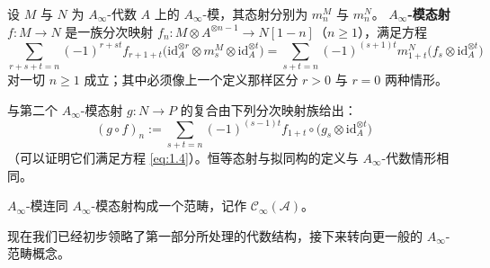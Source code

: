\begin{Def}\label{def:1.9}
设 $M$ 与 $N$ 为 $A_\infty$-代数 $A$ 上的 $A_\infty$-模，其态射分别为 $m_n^M$ 与 $m_n^N$。
\textbf{$A_\infty$-模态射} $f:M\to N$ 是一族分次映射
$f_n:M\otimes A^{\otimes n-1}\to N[1-n]$（$n\ge 1$），满足方程
\begin{equation}\label{eq:1.4}
  \sum_{r+s+t=n}(-1)^{r+st}f_{r+1+t}
  \bigl(\mathrm{id}_A^{\otimes r}\otimes m_s^M\otimes\mathrm{id}_A^{\otimes t}\bigr)
  =\sum_{s+t=n}(-1)^{(s+1)t}m_{1+t}^N\bigl(f_s\otimes\mathrm{id}_A^{\otimes t}\bigr)
\end{equation}
对一切 $n\ge 1$ 成立；其中必须像上一个定义那样区分 $r>0$ 与 $r=0$ 两种情形。

与第二个 $A_\infty$-模态射 $g:N\to P$ 的复合由下列分次映射族给出：
\[
  (g\circ f)_n:=\sum_{s+t=n}(-1)^{(s-1)t}f_{1+t}\circ\bigl(g_s\otimes
  \mathrm{id}_A^{\otimes t}\bigr)
\]
（可以证明它们满足方程 \eqref{eq:1.4}）。恒等态射与拟同构的定义与 $A_\infty$-代数情形相同。

$A_\infty$-模连同 $A_\infty$-模态射构成一个范畴，记作 $\mathcal C_\infty(\mathcal A)$。
\end{Def}


现在我们已经初步领略了第一部分所处理的代数结构，接下来转向更一般的 $A_\infty$-范畴概念。
